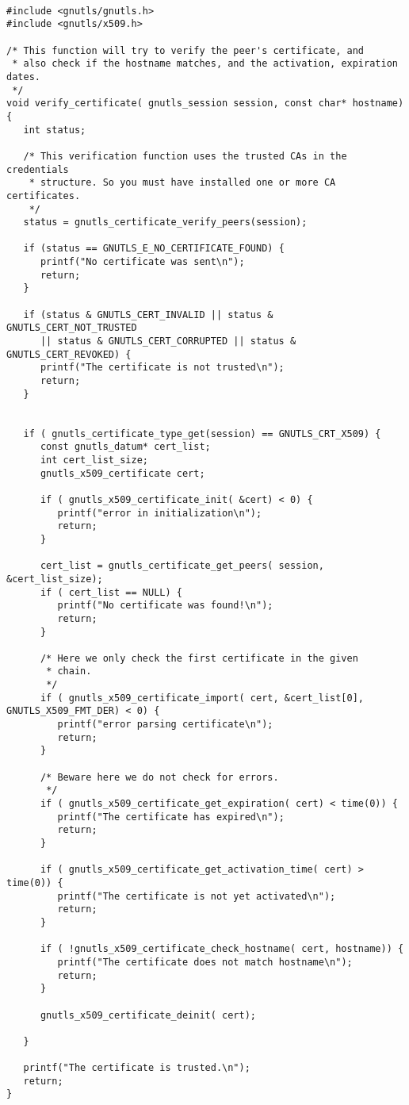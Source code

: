 \label{ex:rfc2818}

\begin{verbatim}

#include <gnutls/gnutls.h>
#include <gnutls/x509.h>

/* This function will try to verify the peer's certificate, and
 * also check if the hostname matches, and the activation, expiration dates.
 */
void verify_certificate( gnutls_session session, const char* hostname)
{
   int status;

   /* This verification function uses the trusted CAs in the credentials
    * structure. So you must have installed one or more CA certificates.
    */
   status = gnutls_certificate_verify_peers(session);

   if (status == GNUTLS_E_NO_CERTIFICATE_FOUND) {
      printf("No certificate was sent\n");
      return;
   }

   if (status & GNUTLS_CERT_INVALID || status & GNUTLS_CERT_NOT_TRUSTED
      || status & GNUTLS_CERT_CORRUPTED || status & GNUTLS_CERT_REVOKED) {
      printf("The certificate is not trusted\n");
      return;
   }


   if ( gnutls_certificate_type_get(session) == GNUTLS_CRT_X509) {
      const gnutls_datum* cert_list;
      int cert_list_size;
      gnutls_x509_certificate cert;

      if ( gnutls_x509_certificate_init( &cert) < 0) {
         printf("error in initialization\n");
         return;
      }

      cert_list = gnutls_certificate_get_peers( session, &cert_list_size);
      if ( cert_list == NULL) {
         printf("No certificate was found!\n");
         return;
      }

      /* Here we only check the first certificate in the given
       * chain.
       */
      if ( gnutls_x509_certificate_import( cert, &cert_list[0], GNUTLS_X509_FMT_DER) < 0) {
         printf("error parsing certificate\n");
         return;
      }

      /* Beware here we do not check for errors.
       */
      if ( gnutls_x509_certificate_get_expiration( cert) < time(0)) {
         printf("The certificate has expired\n");
         return;
      }

      if ( gnutls_x509_certificate_get_activation_time( cert) > time(0)) {
         printf("The certificate is not yet activated\n");
         return;
      }

      if ( !gnutls_x509_certificate_check_hostname( cert, hostname)) {
         printf("The certificate does not match hostname\n");
         return;
      }

      gnutls_x509_certificate_deinit( cert);

   }

   printf("The certificate is trusted.\n");
   return;
}

\end{verbatim}
